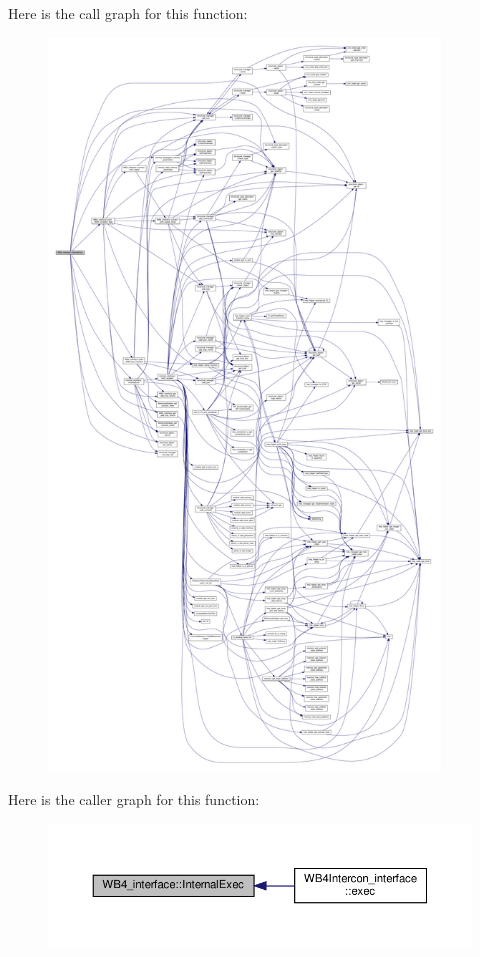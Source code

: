 Here is the call graph for this function\+:
\nopagebreak
\begin{figure}[H]
\begin{center}
\leavevmode
\includegraphics[height=550pt]{d5/d7a/classWB4__interface_ad041a3291160ebf2a0c852ac9ff70a5e_cgraph}
\end{center}
\end{figure}
Here is the caller graph for this function\+:
\nopagebreak
\begin{figure}[H]
\begin{center}
\leavevmode
\includegraphics[width=350pt]{d5/d7a/classWB4__interface_ad041a3291160ebf2a0c852ac9ff70a5e_icgraph}
\end{center}
\end{figure}


